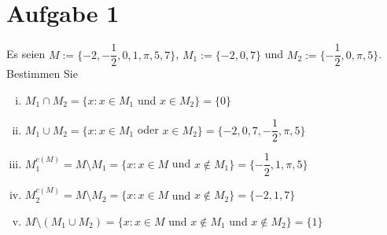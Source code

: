 \section{Aufgabe 1}
\setcounter{section}{1}

Es seien $M := \{ -2, -\dfrac{1}{2}, 0,1, \pi, 5,7 \}$, $M_1 := \{-2, 0, 7\}$ und
$M_2 := \{ -\dfrac{1}{2}, 0, \pi, 5 \}$. Bestimmen Sie
\begin{enumerate}[i)]
    \item $M_1 \cap M_2 = \{ x : x \in M_1$ und $x \in M_2 \} = \{ 0 \}$
    \item $M_1 \cup M_2 = \{ x : x \in M_1$ oder $x \in M_2 \} = \{ -2, 0, 7, -\dfrac{1}{2}, \pi, 5 \}$
    \item $M_1^{c(M)} = M \setminus M_1 = \{ x : x \in M$ und $x \notin M_1 \} = \{ -\dfrac{1}{2}, 1, \pi, 5 \}$
    \item $M_2^{c(M)} = M \setminus M_2 = \{ x : x \in M$ und $x \notin M_2 \} = \{ -2, 1, 7 \}$
    \item $M \setminus (M_1 \cup M_2) = \{ x : x \in M$ und $x \notin M_1$ und $x \notin M_2\} = \{1\}$
\end{enumerate}
